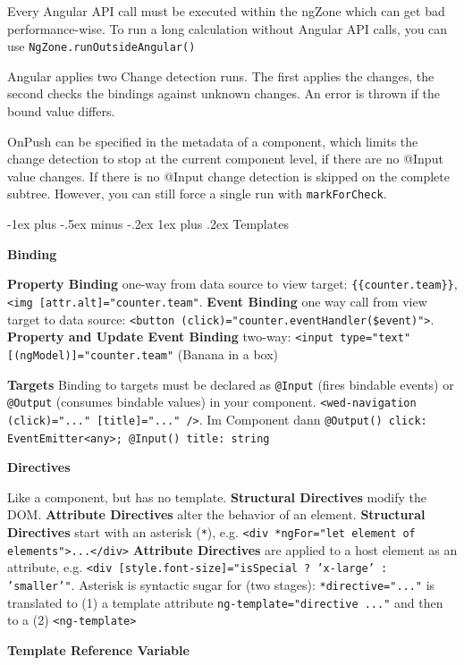 \documentclass[a4paper, fontsize=6pt]{scrartcl}
\makeatletter
\renewcommand{\subsubsection}{\@startsection{subsubsection}{3}{0mm}%
    {-1ex plus -.5ex minus -.2ex}%
    {1ex plus .2ex}%
    {\normalfont\small\bfseries}}
\newcommand{\html}[1]{\texttt{#1}}
\newcommand{\js}[1]{\texttt{#1}}
\makeatother
\begin{document}
\begin{multicols*}{5}
Every Angular API call must be executed within the ngZone which can get bad performance-wise. To run a long calculation without Angular API calls, you can use \js{NgZone.runOutsideAngular()}

Angular applies two Change detection runs. The first applies the changes, the second checks the bindings against unknown changes. An error is thrown if the bound value differs.

OnPush can be specified in the metadata of a component, which limits the change detection to stop at the current component level, if there are no @Input value changes. If there is no @Input change detection is skipped on the complete subtree. However, you can still force a single run with \js{markForCheck}.

\subsubsection{Templates}

\textbf{Binding}

\textbf{Property Binding} one-way from data source to view target: \js{\{\{counter.team\}\}}, \html{<img [attr.alt]="counter.team"}.
\textbf{Event Binding} one way call from view target to data source: \html{<button (click)="counter.eventHandler(\$event)">}. \textbf{Property and Update Event Binding} two-way: \html{<input type="text" [(ngModel)]="counter.team"} (Banana in a box)

\textbf{Targets}
Binding to targets must be declared as \js{@Input} (fires bindable events) or \js{@Output} (consumes bindable values) in your component. \html{<wed-navigation (click)="..." [title]="..." />}. Im Component dann \js{@Output() click: EventEmitter<any>; @Input() title: string }

\textbf{Directives}

Like a component, but has no template. \textbf{Structural Directives} modify the DOM. \textbf{Attribute Directives} alter the behavior of an element. \textbf{Structural Directives} start with an asterisk (\js{*}), e.g. \html{<div *ngFor="let element of elements">...</div>} \textbf{Attribute Directives} are applied to a host element as an attribute, e.g. \html{<div [style.font-size]="isSpecial ? 'x-large' : 'smaller'"}. Asterisk is syntactic sugar for (two stages): \html{*directive="..."} is translated to (1) a template attribute \html{ng-template="directive ..."} and then to a (2) \html{<ng-template>}

\textbf{Template Reference Variable}


\end{multicols*}
\end{document}
